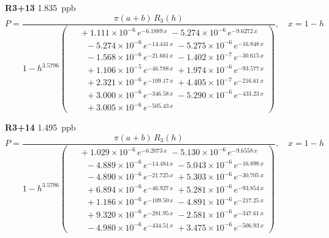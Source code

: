 \documentclass[12pt]{article}
\begin{document}
\noindent\textbf{R3+13} 1.835~ppb\nopagebreak
\begin{equation*}
P = \frac{\pi(a{+}b)\,R_3(h)}{1 - h^{3.5796}\!\left(\!\begin{aligned}
  &\; +1.111{\times}10^{-6}\,e^{-6.1889\,x} \; -5.274{\times}10^{-6}\,e^{-9.6272\,x} \\[-3pt]
  &\quad -5.274{\times}10^{-6}\,e^{-14.441\,x} \; -5.275{\times}10^{-6}\,e^{-16.848\,x} \\[-3pt]
  &\quad -1.568{\times}10^{-6}\,e^{-21.661\,x} \; -1.402{\times}10^{-7}\,e^{-30.615\,x} \\[-3pt]
  &\quad +1.106{\times}10^{-5}\,e^{-46.788\,x} \; +1.974{\times}10^{-6}\,e^{-93.577\,x} \\[-3pt]
  &\quad +2.321{\times}10^{-6}\,e^{-109.17\,x} \; +4.405{\times}10^{-7}\,e^{-216.61\,x} \\[-3pt]
  &\quad +3.000{\times}10^{-6}\,e^{-346.58\,x} \; -5.290{\times}10^{-6}\,e^{-433.23\,x} \\[-3pt]
  &\quad +3.005{\times}10^{-6}\,e^{-505.43\,x}
\end{aligned}\!\right)}, \quad x = 1{-}h
\end{equation*}

\noindent\textbf{R3+14} 1.495~ppb\nopagebreak
\begin{equation*}
P = \frac{\pi(a{+}b)\,R_3(h)}{1 - h^{3.5796}\!\left(\!\begin{aligned}
  &\; +1.029{\times}10^{-6}\,e^{-6.2073\,x} \; -5.130{\times}10^{-6}\,e^{-9.6558\,x} \\[-3pt]
  &\quad -4.889{\times}10^{-6}\,e^{-14.484\,x} \; -5.043{\times}10^{-6}\,e^{-16.898\,x} \\[-3pt]
  &\quad -4.890{\times}10^{-6}\,e^{-21.725\,x} \; +5.303{\times}10^{-6}\,e^{-30.705\,x} \\[-3pt]
  &\quad +6.894{\times}10^{-6}\,e^{-46.927\,x} \; +5.281{\times}10^{-6}\,e^{-93.854\,x} \\[-3pt]
  &\quad +1.186{\times}10^{-6}\,e^{-109.50\,x} \; -4.891{\times}10^{-6}\,e^{-217.25\,x} \\[-3pt]
  &\quad +9.320{\times}10^{-6}\,e^{-281.95\,x} \; -2.581{\times}10^{-6}\,e^{-347.61\,x} \\[-3pt]
  &\quad -4.980{\times}10^{-6}\,e^{-434.51\,x} \; +3.475{\times}10^{-6}\,e^{-506.93\,x}
\end{aligned}\!\right)}, \quad x = 1{-}h
\end{equation*}
\end{document}
